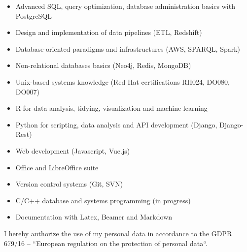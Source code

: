 \documentclass[10pt, a4paper, roman]{moderncv}        %
\begin{document}
	\begin{itemize}
		
		\item Advanced SQL, query optimization, database administration basics with PostgreSQL
		
		\vspace{1pt}
		
		\item Design and implementation of data pipelines (ETL, Redshift)
		
		\vspace{1pt}
		
		\item Database-oriented paradigms and infrastructures (AWS, SPARQL, Spark)
		
		\vspace{1pt}
		
		\item Non-relational databases basics (Neo4j, Redis, MongoDB)
		
		\vspace{1pt}
		
		\item Unix-based systems knowledge (Red Hat certifications RH024, DO080, DO007)
		
		\vspace{1pt}
		
		\item R for data analysis, tidying, visualization and machine learning
		
		\vspace{1pt}
		
		\item Python for scripting, data analysis and API development (Django, Django-Rest)
		
		\vspace{1pt}
		
		\item Web development (Javascript, Vue.js)
		
		\vspace{1pt}
		
		\item Office and LibreOffice suite
		
		\vspace{1pt}
		
		\item Version control systems (Git, SVN)
		
		\vspace{1pt}
		
		\item C/C++ database and systems programming (in progress)
		
		\vspace{1pt}
		
		\item Documentation with Latex, Beamer and Markdown
		
	\end{itemize}
	
	\vspace{80pt}
	I hereby authorize the use of my personal data in accordance to the GDPR 679/16 – “European regulation on the protection of personal data``.
	
\end{document}

